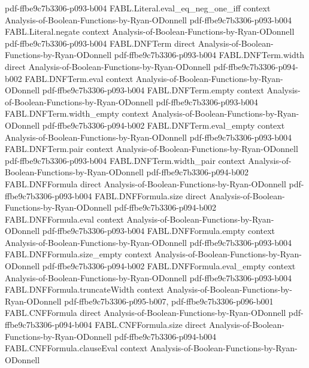 \begin{theorem}
  {pdf-ffbe9c7b3306-p093-b004}
\proofstep
  {FABL.Literal.eval_eq_neg_one_iff}
  {context}
  {Analysis-of-Boolean-Functions-by-Ryan-ODonnell}
  {pdf-ffbe9c7b3306-p093-b004}
\proofstep
  {FABL.Literal.negate}
  {context}
  {Analysis-of-Boolean-Functions-by-Ryan-ODonnell}
  {pdf-ffbe9c7b3306-p093-b004}
\proofstep
  {FABL.DNFTerm}
  {direct}
  {Analysis-of-Boolean-Functions-by-Ryan-ODonnell}
  {pdf-ffbe9c7b3306-p093-b004}
\proofstep
  {FABL.DNFTerm.width}
  {direct}
  {Analysis-of-Boolean-Functions-by-Ryan-ODonnell}
  {pdf-ffbe9c7b3306-p094-b002}
\proofstep
  {FABL.DNFTerm.eval}
  {context}
  {Analysis-of-Boolean-Functions-by-Ryan-ODonnell}
  {pdf-ffbe9c7b3306-p093-b004}
\proofstep
  {FABL.DNFTerm.empty}
  {context}
  {Analysis-of-Boolean-Functions-by-Ryan-ODonnell}
  {pdf-ffbe9c7b3306-p093-b004}
\proofstep
  {FABL.DNFTerm.width_empty}
  {context}
  {Analysis-of-Boolean-Functions-by-Ryan-ODonnell}
  {pdf-ffbe9c7b3306-p094-b002}
\proofstep
  {FABL.DNFTerm.eval_empty}
  {context}
  {Analysis-of-Boolean-Functions-by-Ryan-ODonnell}
  {pdf-ffbe9c7b3306-p093-b004}
\proofstep
  {FABL.DNFTerm.pair}
  {context}
  {Analysis-of-Boolean-Functions-by-Ryan-ODonnell}
  {pdf-ffbe9c7b3306-p093-b004}
\proofstep
  {FABL.DNFTerm.width_pair}
  {context}
  {Analysis-of-Boolean-Functions-by-Ryan-ODonnell}
  {pdf-ffbe9c7b3306-p094-b002}
\proofstep
  {FABL.DNFFormula}
  {direct}
  {Analysis-of-Boolean-Functions-by-Ryan-ODonnell}
  {pdf-ffbe9c7b3306-p093-b004}
\proofstep
  {FABL.DNFFormula.size}
  {direct}
  {Analysis-of-Boolean-Functions-by-Ryan-ODonnell}
  {pdf-ffbe9c7b3306-p094-b002}
\proofstep
  {FABL.DNFFormula.eval}
  {context}
  {Analysis-of-Boolean-Functions-by-Ryan-ODonnell}
  {pdf-ffbe9c7b3306-p093-b004}
\proofstep
  {FABL.DNFFormula.empty}
  {context}
  {Analysis-of-Boolean-Functions-by-Ryan-ODonnell}
  {pdf-ffbe9c7b3306-p093-b004}
\proofstep
  {FABL.DNFFormula.size_empty}
  {context}
  {Analysis-of-Boolean-Functions-by-Ryan-ODonnell}
  {pdf-ffbe9c7b3306-p094-b002}
\proofstep
  {FABL.DNFFormula.eval_empty}
  {context}
  {Analysis-of-Boolean-Functions-by-Ryan-ODonnell}
  {pdf-ffbe9c7b3306-p093-b004}
\proofstep
  {FABL.DNFFormula.truncateWidth}
  {context}
  {Analysis-of-Boolean-Functions-by-Ryan-ODonnell}
  {pdf-ffbe9c7b3306-p095-b007,
    pdf-ffbe9c7b3306-p096-b001}
\proofstep
  {FABL.CNFFormula}
  {direct}
  {Analysis-of-Boolean-Functions-by-Ryan-ODonnell}
  {pdf-ffbe9c7b3306-p094-b004}
\proofstep
  {FABL.CNFFormula.size}
  {direct}
  {Analysis-of-Boolean-Functions-by-Ryan-ODonnell}
  {pdf-ffbe9c7b3306-p094-b004}
\proofstep
  {FABL.CNFFormula.clauseEval}
  {context}
  {Analysis-of-Boolean-Functions-by-Ryan-ODonnell}

\end{theorem}
